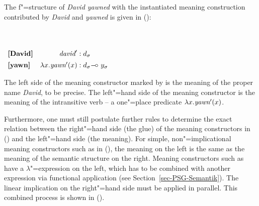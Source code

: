 The f"=structure of \emph{David yawned} with the instantiated meaning construction contributed by \emph{David} and \emph{yawned} is given in ():

\eanoraggedright
 ~\\[-\baselineskip]
~\\[1em]
{$\begin{array}[t]{lr@{\;:\;}l}
\BF{David}&{\relation{david}}&{d_\sigma}\\*[1ex]
\BF{yawn}&{\lambda x. \relation{yawn}(x)}&{d_\sigma \linimp\ y_\sigma}
\end{array}$}
\z

\noindent 
The left side of the meaning constructor marked by  is the meaning of the proper name \emph{David},  to be precise. The left"=hand side of the
meaning constructor  is the meaning of the intransitive verb -- a one"=place predicate $\lambda x. \textit{yawn}'(x)$.

Furthermore, one must still postulate further rules to determine the exact relation between the right"=hand side (the glue) of the meaning constructors in () and the
left"=hand side (the meaning). For simple, non"=implicational meaning constructors such as
 in (), the meaning on the left is the same as the meaning of the semantic structure on the right.
Meaning constructors such as  have a $\lambda$"=expression on the left, which has to be combined with another expression via functional application (see
Section~\ref{sec-PSG-Semantik}). The linear implication on the right"=hand side must be applied in parallel. This combined process is shown in ().

